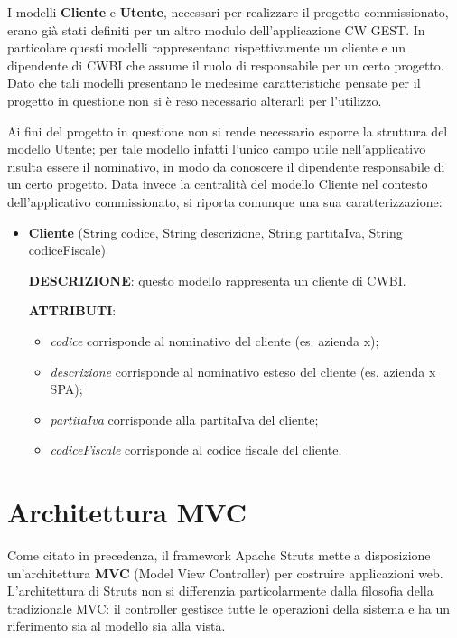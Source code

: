 \setlength{\parskip}{6ex}

\noindent I modelli \textbf{Cliente} e \textbf{Utente}, necessari per realizzare il progetto commissionato, erano già stati definiti per un altro modulo dell'applicazione CW GEST. In particolare questi modelli rappresentano rispettivamente un cliente e un dipendente di CWBI che assume il ruolo di responsabile per un certo progetto. Dato che tali modelli presentano le medesime caratteristiche pensate per il progetto in questione non si è reso necessario alterarli per l'utilizzo.

\setlength{\parskip}{3ex}

\noindent Ai fini del progetto in questione non si rende necessario esporre la struttura del modello Utente; per tale modello infatti l'unico campo utile nell'applicativo risulta essere il nominativo, in modo da conoscere il dipendente responsabile di un certo progetto. Data invece la centralità del modello Cliente nel contesto dell'applicativo commissionato, si riporta comunque una sua caratterizzazione:
\begin{itemize}
\item \textbf{Cliente} (String codice, String descrizione, String partitaIva, String codiceFiscale)

\setlength{\parskip}{3ex}

\textbf{DESCRIZIONE}: questo modello rappresenta un cliente di CWBI.

\setlength{\parskip}{3ex}

\textbf{ATTRIBUTI}:
\begin{itemize}
\item \textit{codice} corrisponde al nominativo del cliente (es. azienda x);
\item \textit{descrizione} corrisponde al nominativo esteso del cliente (es. azienda x SPA);
\item \textit{partitaIva} corrisponde alla partitaIva del cliente;
\item \textit{codiceFiscale} corrisponde al codice fiscale del cliente.
\end{itemize}
\end{itemize} 

\pagebreak

\section{Architettura MVC}
Come citato in precedenza, il framework Apache Struts mette a disposizione un'architettura \textbf{MVC} (Model View Controller) per costruire applicazioni web. \\
L'architettura di Struts non si differenzia particolarmente dalla filosofia della tradizionale MVC: il controller gestisce tutte le operazioni della sistema e ha un riferimento sia al modello sia alla vista. 

